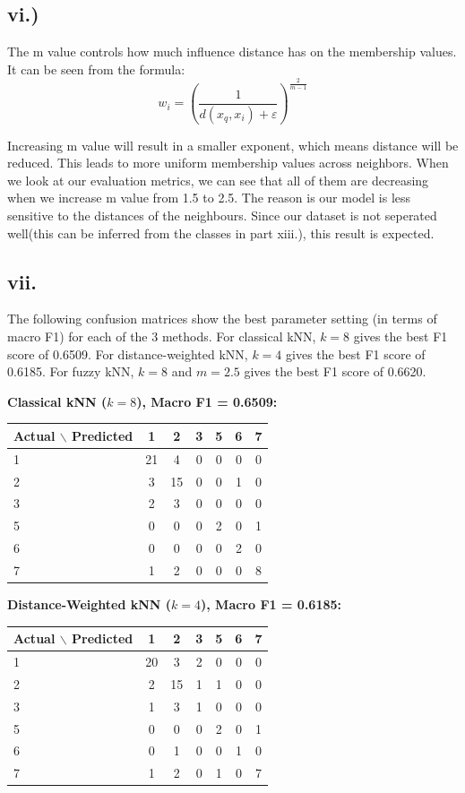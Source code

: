 \documentclass[12pt,a4paper]{article}
\begin{document}
\subsection*{vi.)}

The m value controls how much influence distance has on the membership values. It can be seen from the formula:
$$w_i = \left( \frac{1}{d(x_q, x_i) + \varepsilon} \right)^{\frac{2}{m-1}}$$

Increasing m value will result in a smaller exponent, which means distance will be reduced. This leads to more uniform membership values across neighbors. When we look at our evaluation metrics, we can see that all of them are decreasing when we increase m value from 1.5 to 2.5. The reason is our model is less sensitive to the distances of the neighbours. Since our dataset is not seperated well(this can be inferred from the classes in part xiii.), this result is expected.

\subsection*{vii.}

The following confusion matrices show the best parameter setting (in terms of macro F1) for each of the 3 methods. For classical kNN, $k=8$ gives the best F1 score of 0.6509. For distance-weighted kNN, $k=4$ gives the best F1 score of 0.6185. For fuzzy kNN, $k=8$ and $m=2.5$ gives the best F1 score of 0.6620.


\textbf{Classical kNN ($k=8$), Macro F1 = 0.6509:}

\begin{table}[h]
\centering
\begin{tabular}{l|cccccc}
\toprule
Actual $\backslash$ Predicted & 1 & 2 & 3 & 5 & 6 & 7 \\
\midrule
1 & 21 & 4 & 0 & 0 & 0 & 0 \\
2 & 3 & 15 & 0 & 0 & 1 & 0 \\
3 & 2 & 3 & 0 & 0 & 0 & 0 \\
5 & 0 & 0 & 0 & 2 & 0 & 1 \\
6 & 0 & 0 & 0 & 0 & 2 & 0 \\
7 & 1 & 2 & 0 & 0 & 0 & 8 \\
\bottomrule
\end{tabular}
\end{table}

\textbf{Distance-Weighted kNN ($k=4$), Macro F1 = 0.6185:}

\begin{table}[h]
\centering
\begin{tabular}{l|cccccc}
\toprule
Actual $\backslash$ Predicted & 1 & 2 & 3 & 5 & 6 & 7 \\
\midrule
1 & 20 & 3 & 2 & 0 & 0 & 0 \\
2 & 2 & 15 & 1 & 1 & 0 & 0 \\
3 & 1 & 3 & 1 & 0 & 0 & 0 \\
5 & 0 & 0 & 0 & 2 & 0 & 1 \\
6 & 0 & 1 & 0 & 0 & 1 & 0 \\
7 & 1 & 2 & 0 & 1 & 0 & 7 \\
\bottomrule
\end{tabular}
\end{table}
\end{document}

